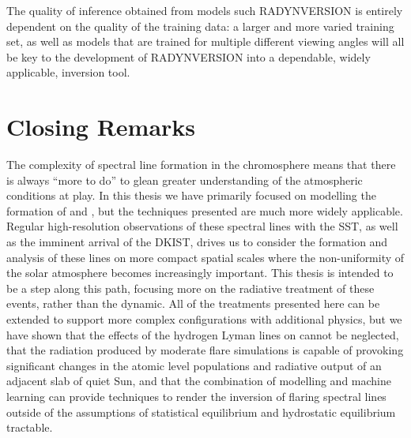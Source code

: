 The quality of inference obtained from models such RADYNVERSION is entirely dependent on the quality of the training data: a larger and more varied training set, as well as models that are trained for multiple different viewing angles will all be key to the development of RADYNVERSION into a dependable, widely applicable, inversion tool.

\section*{Closing Remarks}

The complexity of spectral line formation in the chromosphere means that there is always ``more to do'' to glean greater understanding of the atmospheric conditions at play.
In this thesis we have primarily focused on modelling the formation of \Ha{} and \CaLine{}, but the techniques presented are much more widely applicable.
Regular high-resolution observations of these spectral lines with the SST, as well as the imminent arrival of the DKIST, drives us to consider the formation and analysis of these lines on more compact spatial scales where the non-uniformity of the solar atmosphere becomes increasingly important.
This thesis is intended to be a step along this path, focusing more on the radiative treatment of these events, rather than the dynamic.
All of the treatments presented here can be extended to support more complex configurations with additional physics, but we have shown that the effects of the hydrogen Lyman lines on \Caii{} cannot be neglected, that the radiation produced by moderate flare simulations is capable of provoking significant changes in the atomic level populations and radiative output of an adjacent slab of quiet Sun, and that the combination of modelling and machine learning can provide techniques to render the inversion of flaring spectral lines outside of the assumptions of statistical equilibrium and hydrostatic equilibrium tractable.
